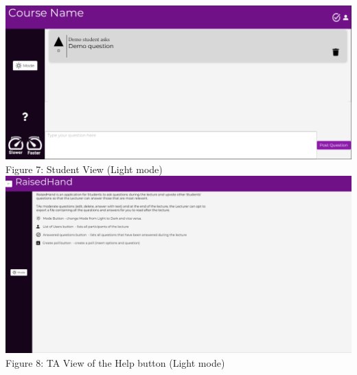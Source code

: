 \documentclass{article}
\begin{document}
\begin{appendices}
        \includegraphics[scale=0.5]{Student_view.png}\\
        Figure 7: Student View (Light mode)\\
        \includegraphics[scale=0.4]{Mod_help.png}\\
        Figure 8: TA View of the Help button (Light mode)\\


\end{appendices}
\end{document}
